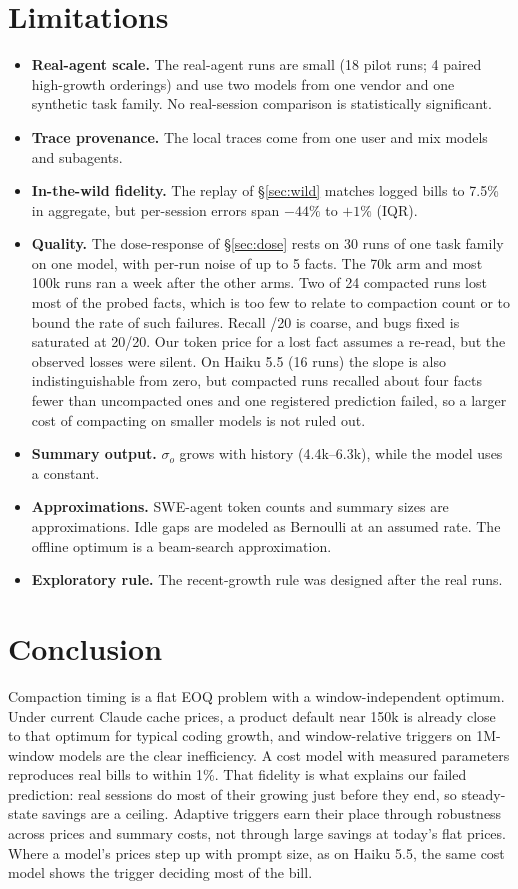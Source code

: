 \documentclass[11pt]{article}
\begin{document}
\section{Limitations}
\begin{itemize}
\item \textbf{Real-agent scale.} The real-agent runs are small (18 pilot runs; 4 paired high-growth orderings) and use two models from one vendor and one synthetic task family. No real-session comparison is statistically significant.
\item \textbf{Trace provenance.} The local traces come from one user and mix models and subagents.
\item \textbf{In-the-wild fidelity.} The replay of \S\ref{sec:wild} matches logged bills to 7.5\% in aggregate, but per-session errors span $-44\%$ to $+1\%$ (IQR).
\item \textbf{Quality.} The dose-response of \S\ref{sec:dose} rests on 30 runs of one task family on one model, with per-run noise of up to 5 facts. The 70k arm and most 100k runs ran a week after the other arms. Two of 24 compacted runs lost most of the probed facts, which is too few to relate to compaction count or to bound the rate of such failures. Recall /20 is coarse, and bugs fixed is saturated at 20/20. Our token price for a lost fact assumes a re-read, but the observed losses were silent. On Haiku 5.5 (16 runs) the slope is also indistinguishable from zero, but compacted runs recalled about four facts fewer than uncompacted ones and one registered prediction failed, so a larger cost of compacting on smaller models is not ruled out.
\item \textbf{Summary output.} $\sigma_o$ grows with history (4.4k--6.3k), while the model uses a constant.
\item \textbf{Approximations.} SWE-agent token counts and summary sizes are approximations. Idle gaps are modeled as Bernoulli at an assumed rate. The offline optimum is a beam-search approximation.
\item \textbf{Exploratory rule.} The recent-growth rule was designed after the real runs.
\end{itemize}

\section{Conclusion}
Compaction timing is a flat EOQ problem with a window-independent optimum. Under current Claude cache prices, a product default near 150k is already close to that optimum for typical coding growth, and window-relative triggers on 1M-window models are the clear inefficiency. A cost model with measured parameters reproduces real bills to within 1\%. That fidelity is what explains our failed prediction: real sessions do most of their growing just before they end, so steady-state savings are a ceiling. Adaptive triggers earn their place through robustness across prices and summary costs, not through large savings at today's flat prices. Where a model's prices step up with prompt size, as on Haiku 5.5, the same cost model shows the trigger deciding most of the bill.
\end{document}
